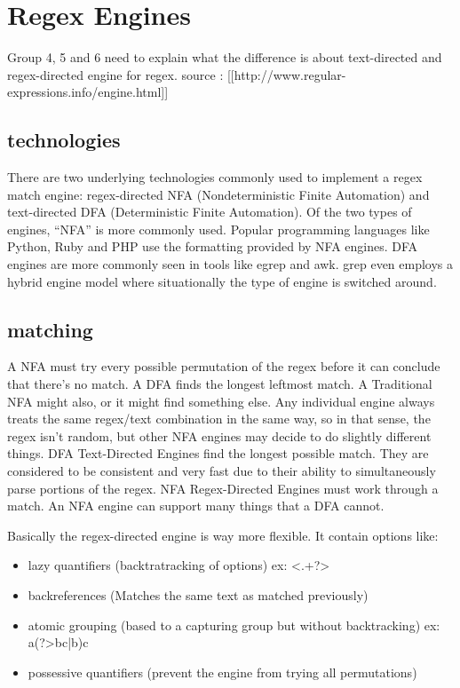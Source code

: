 \section{Regex Engines}
Group 4, 5 and 6 need to explain what the difference is about text-directed and regex-directed engine for regex.
source : [[http://www.regular-expressions.info/engine.html]]

\subsection{technologies}
There are two underlying technologies commonly used to implement a regex match 
engine: regex-directed NFA (Nondeterministic Finite Automation) and 
text-directed DFA (Deterministic Finite Automation). Of the two types of 
engines, “NFA” is more commonly used. Popular programming languages like Python, Ruby 
and PHP use the formatting provided by NFA engines. DFA engines are more commonly seen 
in tools like egrep and awk. grep even employs a hybrid engine model where situationally 
the type of engine is switched around.

\subsection{matching}
A NFA must try every possible permutation of the regex before it can conclude that there's 
no match. A DFA finds the longest leftmost match. A Traditional NFA might also, or it might find something 
else. Any individual engine always treats the same regex/text combination in the 
same way, so in that sense, the regex isn't random, but other NFA engines may 
decide to do slightly different things. DFA Text-Directed Engines find the longest 
possible match. They are considered to be consistent and very fast due to their 
ability to simultaneously parse portions of the regex. NFA Regex-Directed Engines 
must work through a match. An NFA engine can support many things that a DFA cannot. 

Basically the regex-directed engine is way more flexible.
It contain options like:
\begin{itemize}
  \item lazy quantifiers (backtratracking of options) ex: <.+?>
  \item backreferences (Matches the same text as matched previously)
  \item atomic grouping (based to a capturing group but without backtracking) ex: a(?>bc|b)c
  \item possessive quantifiers (prevent the engine from trying all permutations)
\end{itemize}

